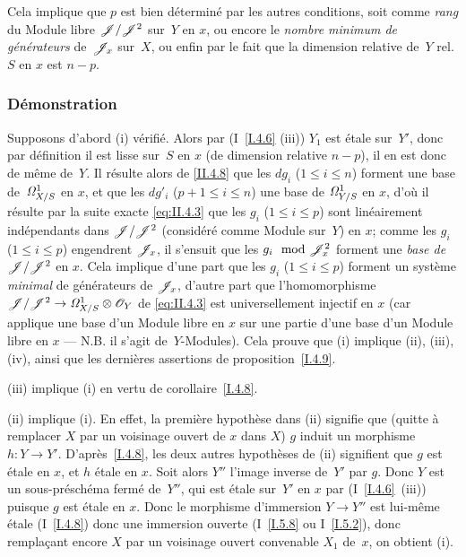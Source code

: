 \begin{remarquestar}
Cela implique que $p$ est bien d\'etermin\'e par les autres
conditions, soit comme \emph{rang} du Module libre
$\cal{J}/\cal{J}^2$ sur~$Y$ en $x$, ou encore le \emph{nombre minimum
de générateurs} de~$\cal{J}_x$ sur~$X$, ou enfin par le fait
que la dimension relative de~$Y$ rel. $S$ en $x$ est $n-p$.
\end{remarquestar}

\subsubsection*{D\'emonstration}
Supposons d'abord (i) v\'erifi\'e. Alors par (I~\ref{I.4.6}
(iii)) $Y_1$ est \'etale sur~$Y'$, donc par d\'efinition il est
lisse sur~$S$ en $x$ (de dimension relative $n-p$), il en est donc de
m\^eme de~$Y$. Il r\'esulte alors de \eqref{II.4.8} que les $dg_i$
($1 \leq i \leq n$) forment une base de~$\it{\Omega}^1_{X/S}$ en $x$,
et que les $dg'_i$ ($p+1 \leq i \leq n$) une base de
$\it{\Omega}^1_{Y/S}$ en $x$, d'o\`u il r\'esulte par la suite
exacte \eqref{eq:II.4.3} que les $g_i$ ($1 \leq i \leq p$) sont
lin\'eairement ind\'ependants dans $\cal{J}/\cal{J}^2$
(consid\'er\'e comme Module sur~$Y$) en $x$; comme les $g_i$ ($1
\leq i \leq p$) engendrent $\cal{J}_x$, il s'ensuit que les $g_i \mod
\cal{J}_x^2$ forment une \emph{base de} $\cal{J}/\cal{J}^2$ en
$x$. Cela implique d'une part que les $g_i$ ($1 \leq i \leq p$)
forment un syst\`eme \emph{minimal} de g\'en\'erateurs de
$\cal{J}_x$, d'autre part que l'homomorphisme $\cal{J}/\cal{J}^2 \to
\it{\Omega}^1_{X/S} \otimes \cal{O}_Y$ de \eqref{eq:II.4.3} est
universellement injectif en $x$ (car applique une base d'un Module
libre en $x$ sur une partie d'une base d'un Module libre en $x$ --- N.B. il s'agit de~$Y$-Modules). Cela prouve que (i) implique (ii),
(iii), (iv), ainsi que les derni\`eres assertions de
proposition~\ref{I.4.9}.

(iii) implique (i) en vertu de corollaire~\ref{I.4.8}.

(ii)
implique (i). En effet, la premi\`ere hypoth\`ese dans (ii)
signifie que (quitte \`a remplacer $X$ par un voisinage ouvert de
$x$ dans $X$) $g$ induit un morphisme $h\colon Y \to
Y'$. D'apr\`es~\ref{I.4.8}, les deux autres hypoth\`eses de (ii)
signifient que $g$ est \'etale en $x$, et $h$ \'etale en $x$. Soit
alors $Y''$ l'image inverse de~$Y'$ par $g$. Donc $Y$ est un
sous-pr\'esch\'ema ferm\'e de~$Y''$, qui est \'etale sur~$Y'$
en $x$ par (I~\ref{I.4.6}~(iii)) puisque $g$ est \'etale en
$x$. Donc le morphisme d'immersion $Y \to Y''$ est lui-m\^eme
\'etale (I~\ref{I.4.8}) donc une immersion ouverte (I~\ref{I.5.8} ou
I~\ref{I.5.2}), donc rempla\c cant encore $X$ par un voisinage
ouvert convenable $X_1$ de~$x$, on obtient (i).

